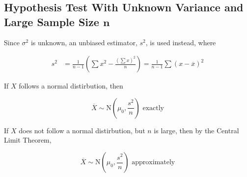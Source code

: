 \documentclass[11pt,a4paper]{book}
\begin{document}
\subsection{Hypothesis Test With Unknown Variance and Large Sample Size $\boldsymbol{n}$}

Since $\sigma^{2}$ is unknown, an unbiased estimator, $s^{2}$, is
used instead, where

\begin{align*}
s^{2} & =\frac{1}{n-1}\left(\sum x^{2}-\frac{\left(\sum x\right)^{2}}{n}\right)=\frac{1}{n-1}\sum\left(x-\overline{x}\right)^{2}
\end{align*}

If $X$ follows a normal distirbution, then

\[
\overline{X}\sim\text{N}\left(\mu_{0},\frac{s^{2}}{n}\right)\text{ exactly}
\]

If $X$ does not follow a normal distirbution, but $n$ is large,
then by the Central Limit Theorem,

\[
\overline{X}\sim\text{N}\left(\mu_{0},\frac{s^{2}}{n}\right)\text{ approximately}
\]
\end{document}
